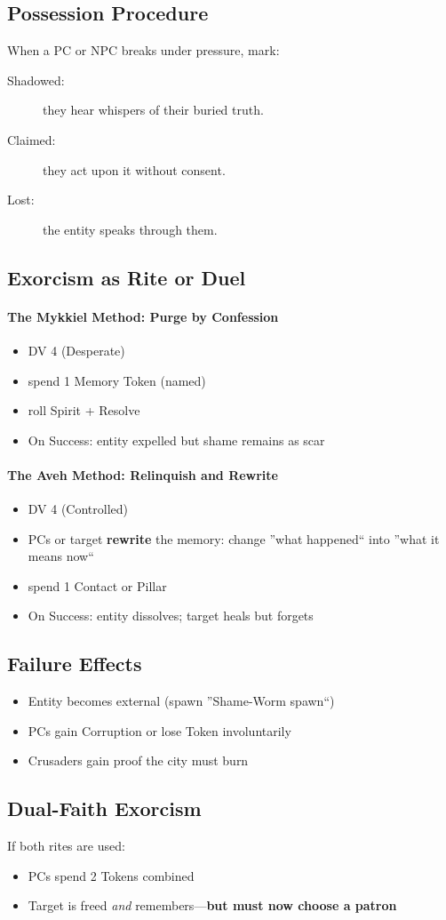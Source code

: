 \documentclass[11pt]{article}
\begin{document}
\subsection*{Possession Procedure}
When a PC or NPC breaks under pressure, mark:
\begin{description}
  \item[Shadowed:] they hear whispers of their buried truth.
  \item[Claimed:] they act upon it without consent.
  \item[Lost:] the entity speaks through them.
\end{description}

\subsection*{Exorcism as Rite or Duel}

\paragraph{The Mykkiel Method: Purge by Confession}
\begin{itemize}
  \item DV 4 (Desperate)
  \item spend 1 Memory Token (named)
  \item roll Spirit + Resolve
  \item On Success: entity expelled but shame remains as scar
\end{itemize}

\paragraph{The Aveh Method: Relinquish and Rewrite}
\begin{itemize}
  \item DV 4 (Controlled)
  \item PCs or target \textbf{rewrite} the memory:
  change ''what happened`` into ''what it means now``
  \item spend 1 Contact or Pillar
  \item On Success: entity dissolves; target heals but forgets
\end{itemize}

\subsection*{Failure Effects}
\begin{itemize}
  \item Entity becomes external (spawn ''Shame-Worm spawn``)
  \item PCs gain Corruption or lose Token involuntarily
  \item Crusaders gain proof the city must burn
\end{itemize}

\subsection*{Dual-Faith Exorcism}
If both rites are used:
\begin{itemize}
  \item PCs spend 2 Tokens combined
  \item Target is freed \emph{and} remembers---\textbf{but must now choose a patron}
\end{itemize}
\end{document}
